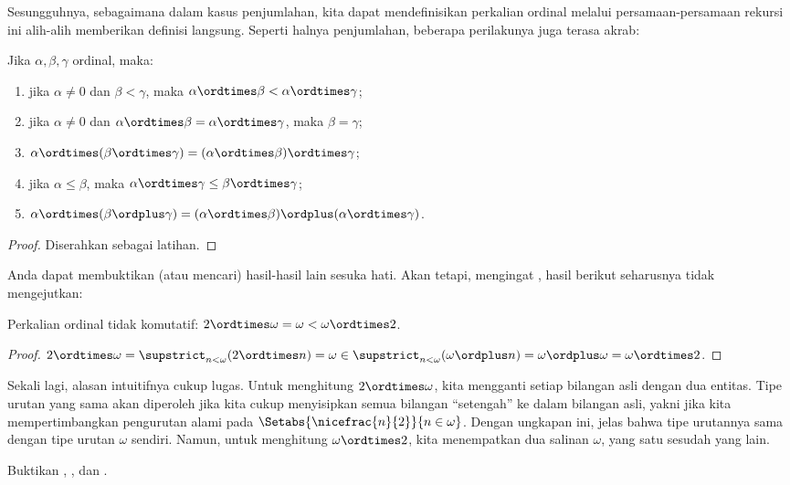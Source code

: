 \documentclass[../../../include/open-logic-section]{subfiles}
\begin{document}
Sesungguhnya, sebagaimana dalam kasus penjumlahan, kita dapat mendefinisikan
perkalian ordinal melalui persamaan-persamaan rekursi ini alih-alih memberikan
definisi langsung. Seperti halnya penjumlahan, beberapa perilakunya juga
terasa akrab:

\begin{lem}
Jika $\alpha, \beta, \gamma$ ordinal, maka:
\begin{enumerate}
	\item{} jika $\alpha \neq 0$ dan $\beta < \gamma$,
	maka $\alpha \ordtimes \beta < \alpha \ordtimes \gamma$;
	\item{} jika $\alpha \neq 0$ dan $\alpha \ordtimes
	\beta = \alpha\ordtimes\gamma$, maka $\beta = \gamma$;
	\item{} $\alpha \ordtimes (\beta \ordtimes
	\gamma) = (\alpha \ordtimes \beta) \ordtimes \gamma$;
	\item{} jika $\alpha \leq \beta$, maka $\alpha
	\ordtimes \gamma \leq \beta \ordtimes \gamma$;
	\item{} $\alpha \ordtimes (\beta \ordplus
	\gamma) = (\alpha \ordtimes \beta )\ordplus (\alpha\ordtimes
	\gamma)$.
\end{enumerate}
\end{lem}

\begin{proof}
Diserahkan sebagai latihan.
\end{proof}

Anda dapat membuktikan (atau mencari) hasil-hasil lain sesuka hati. Akan
tetapi, mengingat , hasil berikut
seharusnya tidak mengejutkan:

\begin{prop}
Perkalian ordinal tidak komutatif: $2 \ordtimes \omega =
\omega < \omega \ordtimes 2$.
\end{prop}

\begin{proof}
$2 \ordtimes \omega = \supstrict_{n < \omega}(2\ordtimes n) = \omega \in
\supstrict_{n < \omega}(\omega \ordplus n) = \omega \ordplus \omega =
\omega \ordtimes 2$.
\end{proof}
\noindent
Sekali lagi, alasan intuitifnya cukup lugas. Untuk menghitung $2 \ordtimes
\omega$, kita mengganti setiap bilangan asli dengan dua entitas. Tipe urutan
yang sama akan diperoleh jika kita cukup menyisipkan semua bilangan
``setengah'' ke dalam bilangan asli, yakni jika kita mempertimbangkan
pengurutan alami pada $\Setabs{\nicefrac{n}{2}}{n \in \omega}$. Dengan
ungkapan ini, jelas bahwa tipe urutannya sama dengan tipe urutan $\omega$
sendiri. Namun, untuk menghitung $\omega \ordtimes 2$, kita menempatkan dua
salinan $\omega$, yang satu sesudah yang lain.

\begin{prob}
Buktikan
,
,
dan
.
\end{prob}
\end{document}
